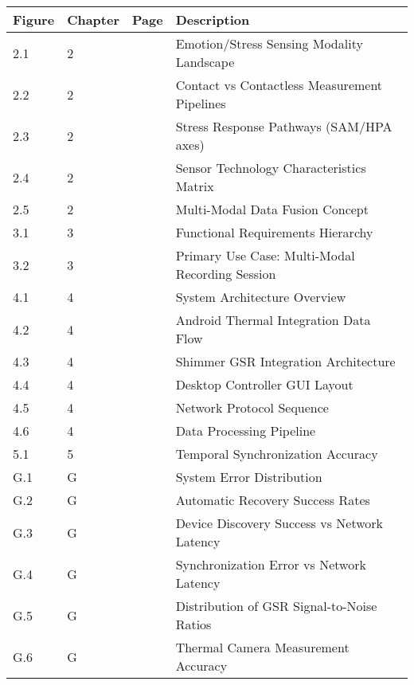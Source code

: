 \begin{longtable}{|l|l|l|p{6cm}|}
\hline
\textbf{Figure} & \textbf{Chapter} & \textbf{Page} & \textbf{Description} \\
\hline
\endhead
2.1 & 2 & \pageref{fig:emotion_sensing_landscape} & Emotion/Stress Sensing Modality Landscape \\
2.2 & 2 & \pageref{fig:contact_vs_contactless} & Contact vs Contactless Measurement Pipelines \\
2.3 & 2 & \pageref{fig:stress_response_pathways} & Stress Response Pathways (SAM/HPA axes) \\
2.4 & 2 & \pageref{fig:sensor_technology_matrix} & Sensor Technology Characteristics Matrix \\
2.5 & 2 & \pageref{fig:multimodal_fusion_concept} & Multi-Modal Data Fusion Concept \\
3.1 & 3 & \pageref{fig:functional_requirements} & Functional Requirements Hierarchy \\
3.2 & 3 & \pageref{fig:recording_use_case} & Primary Use Case: Multi-Modal Recording Session \\
4.1 & 4 & \pageref{fig:system_architecture} & System Architecture Overview \\
4.2 & 4 & \pageref{fig:thermal_integration} & Android Thermal Integration Data Flow \\
4.3 & 4 & \pageref{fig:shimmer_integration} & Shimmer GSR Integration Architecture \\
4.4 & 4 & \pageref{fig:desktop_gui} & Desktop Controller GUI Layout \\
4.5 & 4 & \pageref{fig:protocol_sequence} & Network Protocol Sequence \\
4.6 & 4 & \pageref{fig:data_pipeline} & Data Processing Pipeline \\
5.1 & 5 & \pageref{fig:sync_accuracy} & Temporal Synchronization Accuracy \\
G.1 & G & \pageref{fig:error_distribution} & System Error Distribution \\
G.2 & G & \pageref{fig:recovery_rates} & Automatic Recovery Success Rates \\
G.3 & G & \pageref{fig:discovery_performance} & Device Discovery Success vs Network Latency \\
G.4 & G & \pageref{fig:sync_vs_latency} & Synchronization Error vs Network Latency \\
G.5 & G & \pageref{fig:gsr_snr_distribution} & Distribution of GSR Signal-to-Noise Ratios \\
G.6 & G & \pageref{fig:thermal_accuracy} & Thermal Camera Measurement Accuracy \\

\end{longtable}
